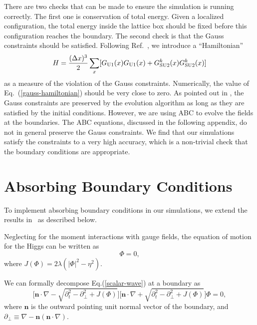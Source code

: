 \documentclass[prd,twocolumn,nofootinbib]{revtex4-1}
\begin{document}
There are two checks that can be made to ensure the simulation is running 
correctly. The first one is conservation 
of total energy. Given a localized configuration, the total energy inside the 
lattice box should be fixed before this configuration reaches the boundary. 
The second check is that the Gauss constraints should be satisfied.
Following Ref.~\cite{rajantie2001electroweak}, we introduce a ``Hamiltonian''
\begin{equation}
\label{gauss-hamiltonian}
H = \frac{(\Delta x)^3}{2}\sum_{x} [G_{\rm U1}(x)G_{\rm U1}(x)+G_{\rm SU2}^k(x)G_{\rm SU2}^k(x)] 
\end{equation}
as a measure of the violation of the Gauss constraints. Numerically, the value of Eq.~(\ref{gauss-hamiltonian}) should 
be very close to zero.
As pointed out in \cite{moore1996improved}, the Gauss constraints are 
preserved by the evolution algorithm as long as they are satisfied by
the initial conditions. However, we are using ABC to evolve the fields 
at the boundaries. The ABC equations, discussed in the following appendix, 
do not in general preserve the Gauss constraints.
We find that our simulations satisfy the constraints to a very high
accuracy, which is a non-trivial check that the boundary conditions are 
appropriate.

\section{Absorbing Boundary Conditions} \label{abc}

To implement absorbing boundary conditions in our simulations, we 
extend the results 
in~\cite{engquist1977absorbing, szeftel2006nonlinear, feng1999absorbing}
as described below. 

Neglecting for the moment interactions with gauge fields, the equation
of motion for the Higgs can be written as
\begin{equation}
[\partial_t^2-\nabla^2+J(\Phi)]\Phi=0,
\label{scalar-wave}
\end{equation}
where $J(\Phi)=2\lambda(\vert \Phi \vert^2-\eta^2)$.

We can formally decompose Eq.(\ref{scalar-wave}) at a boundary as
\begin{equation}
\big[\bm{n}\cdot\nabla-\sqrt{\partial_t^2-\partial_\perp^2+J(\Phi)}\big]\big[\bm{n}\cdot\nabla+\sqrt{\partial_t^2-\partial_\perp^2+J(\Phi)}\big]\Phi=0,
\end{equation}
where $\bm{n}$ is the outward pointing unit normal vector of the boundary,
and $\partial_\perp \equiv \nabla - \bm{n} (\bm{n} \cdot \nabla)$.
\end{document}
